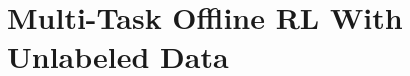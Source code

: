 \documentclass[../thesis.tex]{subfiles}
\begin{document}
\vspace{-0.2cm}
\section{Multi-Task Offline RL With Unlabeled Data}
\label{sec:uds_section}
\vspace{-0.2cm}


\end{document}
